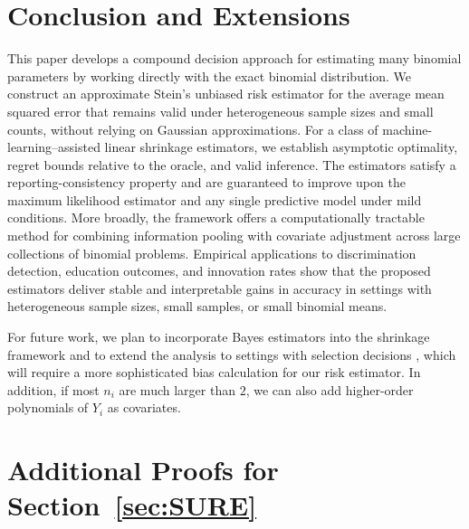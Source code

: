 \documentclass[12pt,letterpaper]{article}
\begin{document}
\section{Conclusion and Extensions}
This paper develops a compound decision approach for estimating many binomial parameters by working directly with the exact binomial distribution. We construct an approximate Stein’s unbiased risk estimator for the average mean squared error that remains valid under heterogeneous sample sizes and small counts, without relying on Gaussian approximations. For a class of machine-learning–assisted linear shrinkage estimators, we establish asymptotic optimality, regret bounds relative to the oracle, and valid inference. The estimators satisfy a reporting-consistency property and are guaranteed to improve upon the maximum likelihood estimator and any single predictive model under mild conditions. More broadly, the framework offers a computationally tractable method for combining information pooling with covariate adjustment across large collections of binomial problems. Empirical applications to discrimination detection, education outcomes, and innovation rates show that the proposed estimators deliver stable and interpretable gains in accuracy in settings with heterogeneous sample sizes, small samples, or small binomial means.

For future work, we plan to incorporate Bayes estimators into the shrinkage framework and to extend the analysis to settings with selection decisions \citep{chen2025compound}, which will require a more sophisticated bias calculation for our risk estimator. In addition, if most $n_i$ are much larger than $2$, we can also add higher-order polynomials of $Y_i$ as covariates. 


\clearpage



\clearpage
\appendix



\section{Additional Proofs for Section~\ref{sec:SURE}}
\end{document}
